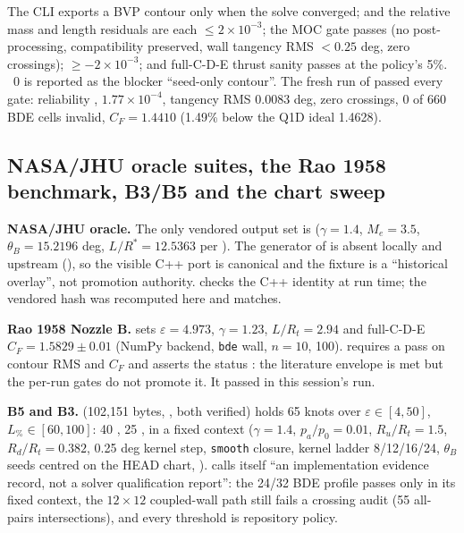 The CLI exports a BVP contour only when the solve converged;  and the relative mass and length
residuals are each $\le 2\times10^{-3}$; the MOC gate passes (no post-processing, compatibility preserved, wall
tangency RMS $< 0.25$ deg, zero crossings);  $\ge -2\times10^{-3}$; and full-C-D-E thrust
sanity passes at the policy's 5\%. ~0 is reported as the blocker ``seed-only contour''. The fresh
run of  passed every gate: reliability
,  $1.77\times10^{-4}$, tangency RMS 0.0083 deg, zero
crossings, 0 of 660 BDE cells invalid, $C_F = 1.4410$ (1.49\% below the Q1D ideal 1.4628).

\subsection{NASA/JHU oracle suites, the Rao 1958 benchmark, B3/B5 and the chart sweep}

\textbf{NASA/JHU oracle.} The only vendored output set is
 ($\gamma = 1.4$, $M_e = 3.5$,
$\theta_B = 15.2196$ deg, $L/R^* = 12.5363$ per ). The generator of  is absent locally
and upstream (), so the visible C++ port is canonical and the fixture is a
``historical overlay'', not promotion authority.  checks the C++ identity at run
time; the vendored  hash was recomputed here and matches.

\textbf{Rao 1958 Nozzle B.}  sets $\varepsilon = 4.973$,
$\gamma = 1.23$, $L/R_t = 2.94$ and full-C-D-E $C_F = 1.5829\pm0.01$ (NumPy backend, \texttt{bde} wall, $n = 10$,
 100).  requires a pass on
contour RMS and $C_F$ and asserts the status : the literature envelope is met but the
per-run gates do not promote it. It passed in this session's run.

\textbf{B5 and B3.} 
(102,151 bytes,  , both verified) holds 65 knots over
$\varepsilon \in [4, 50]$, $L_\% \in [60, 100]$: 40 , 25 , in a fixed
context ($\gamma = 1.4$, $p_a/p_0 = 0.01$, $R_u/R_t = 1.5$, $R_d/R_t = 0.382$, 0.25 deg kernel step,
\texttt{smooth} closure, kernel ladder 8/12/16/24, $\theta_B$ seeds centred on the HEAD chart,
).  calls itself ``an implementation
evidence record, not a solver qualification report'': the 24/32 BDE profile passes only in its fixed context, the
$12\times12$ coupled-wall path still fails a crossing audit (55 all-pairs intersections), and every threshold is
repository policy.

